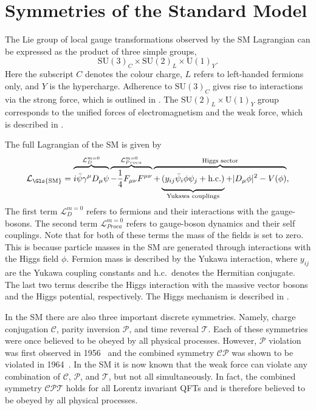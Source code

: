 \section{Symmetries of the Standard Model}
\label{sec:symmetries_of_sm}

The Lie group of local gauge transformations observed by the \Gls{SM} Lagrangian can be expressed as the product of three simple groups,
\begin{equation}
    \label{eq:sm_group}
    \text{SU}(3)_C \times \text{SU}(2)_L \times \text{U}(1)_Y.
\end{equation}
Here the subscript $C$ denotes the colour charge, $L$ refers to left-handed fermions only, and $Y$ is the hypercharge.
Adherence to $\text{SU}(3)_C$ gives rise to interactions via the strong force, which is outlined in .
The $\text{SU}(2)_L \times \text{U}(1)_Y$ group corresponds to the unified forces of electromagnetism and the weak force, which is described in .

The full Lagrangian of the \Gls{SM} is given by
\begin{equation}
    \label{eq:sm_lagrangian}
    \mathcal{L}_\text{\Gls{SM}} =
    \overbrace{
        \vphantom{\frac{1}{4}}
        i \bar \psi \gamma^\mu D_\mu \psi
    }^{\mathcal{L}_{D}^{m=0}
    }
    \overbrace{
        -\frac{1}{4} F_{\mu\nu} F^{\mu\nu}
    }^{\mathcal{L}_{Proca}^{m=0}
    }
    \overbrace{
        +
        \underbrace{
            \vphantom{\frac{1}{4}}
            (y_{ij} \bar \psi_i \phi \psi_j
            + \text{h.c.})
        }_{\text{Yukawa couplings}}
        + |D_\mu \phi|^2
        - V(\phi)
    }^{\text{Higgs sector}},
\end{equation}
The first term $\mathcal{L}_D^{m=0}$ refers to fermions and their interactions with the gauge-bosons.
The second term $\mathcal{L}_{Proca}^{m=0}$ refers to gauge-boson dynamics and their self couplings.
Note that for both of these terms the mass of the fields is set to zero.
This is because particle masses in the \Gls{SM} are generated through interactions with the Higgs field $\phi$.
Fermion mass is described by the Yukawa interaction, where $y_{ij}$ are the Yukawa coupling constants and h.c.\ denotes the Hermitian conjugate.
The last two terms describe the Higgs interaction with the massive vector bosons and the Higgs potential, respectively.
The Higgs mechanism is described in .

In the \Gls{SM} there are also three important discrete symmetries.
Namely, charge conjugation $\mathcal{C}$, parity inversion $\mathcal{P}$, and time reversal $\mathcal{T}$.
Each of these symmetries were once believed to be obeyed by all physical processes.
However, $\mathcal{P}$ violation was first observed in 1956~\cite{Wu1957} and the combined symmetry $\mathcal{CP}$ was shown to be violated in 1964~\cite{CPViolation}.
In the \Gls{SM} it is now known that the weak force can violate any combination of $\mathcal{C}$, $\mathcal{P}$, and $\mathcal{T}$, but not all simultaneously.
In fact, the combined symmetry $\mathcal{CPT}$ holds for all Lorentz invariant QFTs and is therefore believed to be obeyed by all physical processes.

